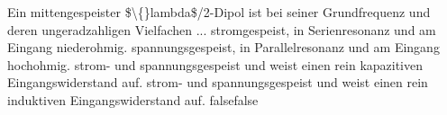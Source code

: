     {Ein mittengespeister \$\textbackslash\{\}lambda\$/2-Dipol ist bei seiner Grundfrequenz und deren ungeradzahligen Vielfachen ...}
    {stromgespeist, in Serienresonanz und am Eingang niederohmig.}
    {spannungsgespeist, in Parallelresonanz und am Eingang hochohmig.}
    {strom- und spannungsgespeist und weist einen rein kapazitiven Eingangswiderstand auf.}
    {strom- und spannungsgespeist und weist einen rein induktiven Eingangswiderstand auf.}
    {false}{false}